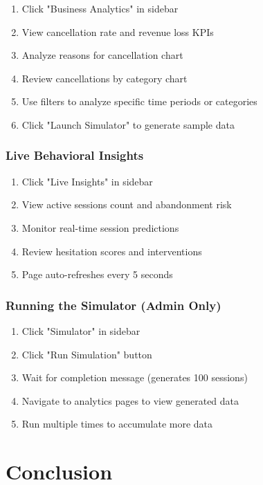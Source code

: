 \documentclass[12pt,a4paper]{article}
\begin{document}
\begin{enumerate}[leftmargin=*]
    \item Click "Business Analytics" in sidebar
    \item View cancellation rate and revenue loss KPIs
    \item Analyze reasons for cancellation chart
    \item Review cancellations by category chart
    \item Use filters to analyze specific time periods or categories
    \item Click "Launch Simulator" to generate sample data
\end{enumerate}

\subsubsection{Live Behavioral Insights}

\begin{enumerate}[leftmargin=*]
    \item Click "Live Insights" in sidebar
    \item View active sessions count and abandonment risk
    \item Monitor real-time session predictions
    \item Review hesitation scores and interventions
    \item Page auto-refreshes every 5 seconds
\end{enumerate}

\subsubsection{Running the Simulator (Admin Only)}

\begin{enumerate}[leftmargin=*]
    \item Click "Simulator" in sidebar
    \item Click "Run Simulation" button
    \item Wait for completion message (generates 100 sessions)
    \item Navigate to analytics pages to view generated data
    \item Run multiple times to accumulate more data
\end{enumerate}

\newpage

\section{Conclusion}
\end{document}
